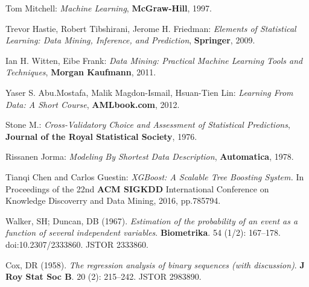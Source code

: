 \begin{thebibliography}{9}
Tom Mitchell: \textit{Machine Learning}, \textbf{McGraw-Hill}, 1997.

Trevor Hastie, Robert Tibshirani, Jerome H. Friedman: \textit{Elements of Statistical Learning: Data Mining, Inference, and Prediction}, \textbf{Springer}, 2009.

Ian H. Witten, Eibe Frank: \textit{Data Mining: Practical Machine Learning Tools and Techniques}, \textbf{Morgan Kaufmann}, 2011.

Yaser S. Abu.Mostafa, Malik Magdon-Ismail, Hsuan-Tien Lin: \textit{Learning From Data: A Short Course}, \textbf{AMLbook.com}, 2012.

Stone M.: \textit{Cross-Validatory Choice and Assessment of Statistical Predictions}, \textbf{Journal of the Royal Statistical Society}, 1976. 

Rissanen Jorma: \textit{Modeling By Shortest Data Description}, \textbf{Automatica}, 1978.

Tianqi Chen and Carlos Guestin: \textit{XGBoost: A Scalable Tree Boosting System.} In Proceedings of the 22nd \textbf{ACM SIGKDD} International Conference on Knowledge Discoverry and Data Mining, 2016, pp.785794.

Walker, SH; Duncan, DB (1967). \textit{Estimation of the probability of an event as a function of several independent variables}. \textbf{Biometrika}. 54 (1/2): 167–178. doi:10.2307/2333860. JSTOR 2333860.

Cox, DR (1958). \textit{The regression analysis of binary sequences (with discussion)}. \textbf{J Roy Stat Soc B}. 20 (2): 215–242. JSTOR 2983890. 

\end{thebibliography}